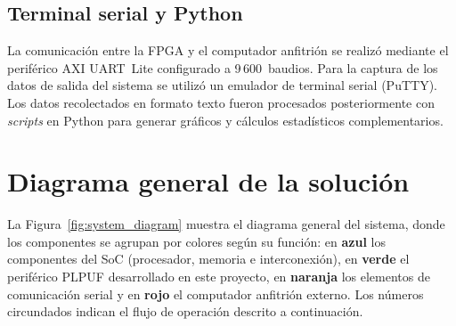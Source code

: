 \subsection{Terminal serial y Python}
\label{sec:hw_terminal}

La comunicación entre la FPGA y el computador anfitrión se realizó mediante
el periférico AXI UART~Lite configurado a 9\,600~baudios. Para la captura de
los datos de salida del sistema se utilizó un emulador de terminal serial
(PuTTY). Los datos recolectados en formato texto fueron
procesados posteriormente con \textit{scripts} en Python para generar
gráficos y cálculos estadísticos complementarios.

\section{Diagrama general de la solución}
\label{sec:diagrama_general}

La
Figura~\ref{fig:system_diagram} muestra el diagrama general del sistema,
donde los componentes se agrupan por colores según su función: en
\textcolor{blue!70}{\textbf{azul}} los componentes del SoC (procesador,
memoria e interconexión), en \textcolor{green!60!black}{\textbf{verde}} el
periférico PLPUF desarrollado en este proyecto, en
\textcolor{orange!80!black}{\textbf{naranja}} los elementos de comunicación
serial y en \textcolor{red!60!black}{\textbf{rojo}} el computador anfitrión
externo. Los números circundados indican el flujo de operación descrito a
continuación.

